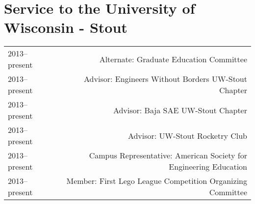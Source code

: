 \section*{Service to the University of Wisconsin - Stout}
\begin{tabular}{L!{\VRule}R}
2013--present&Alternate: Graduate Education Committee \\
2013--present&Advisor: Engineers Without Borders UW-Stout Chapter \\
2013--present&Advisor: Baja SAE UW-Stout Chapter \\
2013--present&Advisor: UW-Stout Rocketry Club\\
2013--present&Campus Representative: American Society for Engineering Education\\
2013--present&Member: First Lego League Competition Organizing Committee\\
\end{tabular}